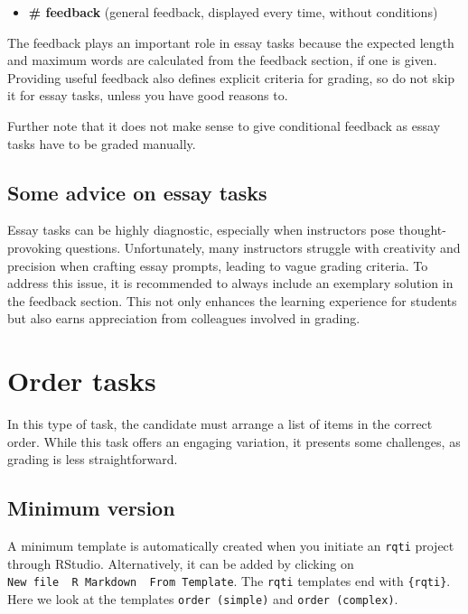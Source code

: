 \documentclass[twoside]{tufte-book}
\providecommand{\tightlist}{%
  \setlength{\itemsep}{0pt}\setlength{\parskip}{0pt}}
\begin{document}
\begin{itemize}
\tightlist
\item
  \textbf{\# feedback} (general feedback, displayed every time, without conditions)
\end{itemize}

The feedback plays an important role in essay tasks because the expected length and maximum words are calculated from the feedback section, if one is given. Providing useful feedback also defines explicit criteria for grading, so do not skip it for essay tasks, unless you have good reasons to.

Further note that it does not make sense to give conditional feedback as essay tasks have to be graded manually.

\section{Some advice on essay tasks}\label{some-advice-on-essay-tasks}

Essay tasks can be highly diagnostic, especially when instructors pose thought-provoking questions. Unfortunately, many instructors struggle with creativity and precision when crafting essay prompts, leading to vague grading criteria. To address this issue, it is recommended to always include an exemplary solution in the feedback section. This not only enhances the learning experience for students but also earns appreciation from colleagues involved in grading.

\chapter{Order tasks}\label{order-tasks}

In this type of task, the candidate must arrange a list of items in the correct order. While this task offers an engaging variation, it presents some challenges, as grading is less straightforward.

\section{Minimum version}\label{minimum-version-5}

A minimum template is automatically created when you initiate an \texttt{rqti} project through RStudio. Alternatively, it can be added by clicking on \texttt{New\ file\ \textrightarrow{}\ R\ Markdown\ \textrightarrow{}\ From\ Template}. The \texttt{rqti} templates end with \texttt{\{rqti\}}. Here we look at the templates \texttt{order\ (simple)} and \texttt{order\ (complex)}.
\end{document}
